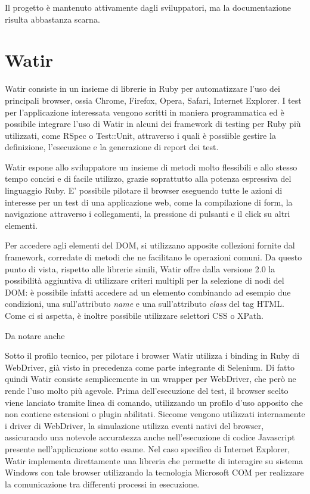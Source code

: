 Il progetto è mantenuto attivamente dagli sviluppatori, ma la documentazione risulta abbastanza scarna. %

\section{Watir}

Watir consiste in un insieme di librerie in Ruby per automatizzare l'uso dei principali browser, ossia Chrome, Firefox, Opera, Safari, Internet Explorer. I test per l'applicazione interessata vengono scritti in maniera programmatica ed è possibile integrare l'uso di Watir in alcuni dei framework di testing per Ruby più utilizzati, come RSpec o Test::Unit, attraverso i quali è possiible gestire la definizione, l'esecuzione e la generazione di report dei test.

Watir espone allo sviluppatore un insieme di metodi molto flessibili e allo stesso tempo concisi e di facile utilizzo, grazie soprattutto alla potenza espressiva del linguaggio Ruby. E' possibile pilotare il browser eseguendo tutte le azioni di interesse per un test di una applicazione web, come la compilazione di form, la navigazione attraverso i collegamenti, la pressione di pulsanti e il click su altri elementi. 

Per accedere agli elementi del DOM, si utilizzano apposite collezioni fornite dal framework, corredate di metodi che ne facilitano le operazioni comuni. Da questo punto di vista, rispetto alle librerie simili, Watir offre dalla versione 2.0 la possibilità aggiuntiva di utilizzare criteri multipli per la selezione di nodi del DOM: è possibile infatti accedere ad un elemento combinando ad esempio due condizioni, una sull'attributo \emph{name} e una sull'attributo \emph{class} del tag HTML. Come ci si aspetta, è inoltre possibile utilizzare selettori CSS o XPath.

Da notare anche 

Sotto il profilo tecnico, per pilotare i browser Watir utilizza i binding in Ruby di WebDriver, già visto in precedenza come parte integrante di Selenium. Di fatto quindi Watir consiste semplicemente in un wrapper per WebDriver, che però ne rende l'uso molto più agevole. Prima dell'esecuzione del test, il browser scelto viene lanciato tramite linea di comando, utilizzando un profilo d'uso apposito che non contiene estensioni o plugin abilitati. Siccome vengono utilizzati internamente i driver di WebDriver, la simulazione utilizza eventi nativi del browser, assicurando una notevole accuratezza anche nell'esecuzione di codice Javascript presente nell'applicazione sotto esame. Nel caso specifico di Internet Explorer, Watir implementa direttamente una libreria che permette di interagire su sistema Windows con tale browser utilizzando la tecnologia Microsoft COM per realizzare la comunicazione tra differenti processi in esecuzione.

